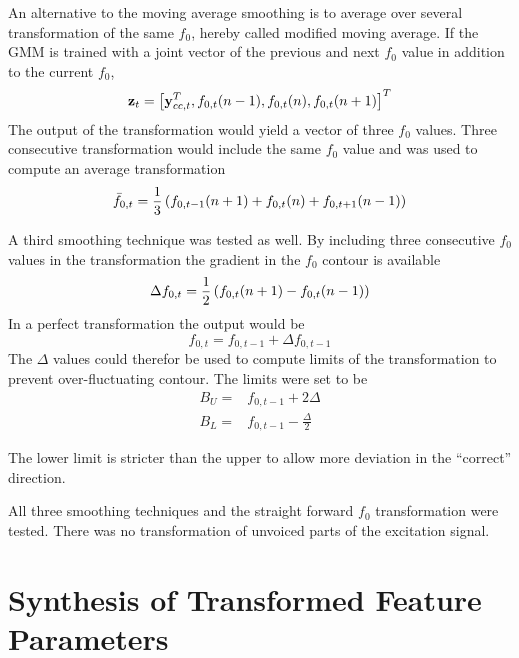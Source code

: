 An alternative to the moving average smoothing is to average over several transformation of the same $f_0$, hereby called modified moving average. If the GMM is trained with a joint vector of the previous and next $f_0$ value in addition to the current $f_0$,
\begin{equation}
	\mathbf{z}_t = \left[\mathbf{y}_{cc,t}^T, f_{0,t}(n-1), f_{0,t}(n), f_{0,t}(n+1)\right]^T 
\end{equation}
The output of the transformation would yield a vector of three $f_0$ values. Three consecutive transformation would include the same $f_0$ value and was used to compute an average transformation
\begin{equation}
	\bar{f}_{0,t} = \frac{1}{3}\left(f_{0,t-1}(n+1)+f_{0,t}(n)+f_{0,t+1}(n-1)\right) 
\end{equation}

A third smoothing technique was tested as well. By including three consecutive $f_0$ values in the transformation the gradient in the $f_0$ contour is available
\begin{equation}
	\Delta f_{0,t} = \frac{1}{2}\left(f_{0,t}(n+1)-f_{0,t}(n-1)\right)
\end{equation}
In a perfect transformation the output would be
\begin{equation}
	f_{0,t} = f_{0,t-1} + \Delta f_{0,t-1}
\end{equation}
The $\Delta$ values could therefor be used to compute limits of the transformation to prevent over-fluctuating contour. The limits were set to be
\begin{equation}
	\begin{split}
		B_U = & f_{0,t-1} + 2\Delta\\
		B_L = & f_{0,t-1} - \frac{\Delta}{2}
	\end{split}
\end{equation} 
\begin{remark}
	The lower limit is stricter than the upper to allow more deviation in the ``correct'' direction.
\end{remark}

All three smoothing techniques and the straight forward $f_0$ transformation were tested. There was no transformation of unvoiced parts of the excitation signal.


\section{Synthesis of Transformed Feature Parameters} %
\label{sec:synthesis_of_transformed_feature_parameters}

